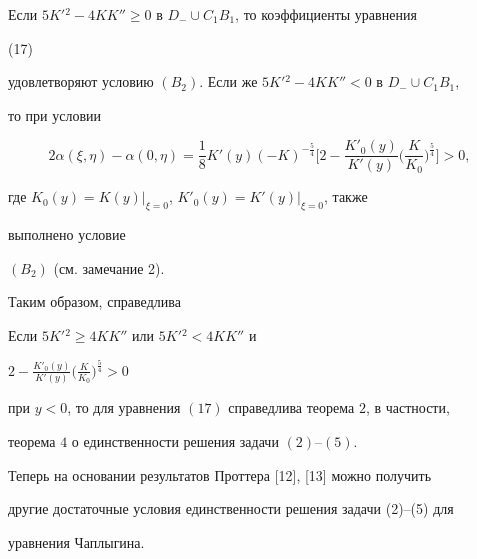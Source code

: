Если $5K'{}^2-4K K''\ge0$ в $D_-\cup C_1B_1$, то коэффициенты уравнения 


(17) 


удовлетворяют условию $(B_2)$. Если же $5K'{}^2-4K K''<0$ в $D_-\cup 


C_1B_1$, 


то при условии 


$$ 


2\alpha(\xi,\eta)-\alpha(0,\eta)=\frac{1}{8}K'(y)(-K)^{-\frac{5}{4}} 


\bigg[2-\frac{K'_0(y)}{K'(y)}\bigg(\frac{K}{K_0}\bigg)^{\frac{5}{4}} 


\bigg]>0, 


$$ 


где $K_0(y)=K(y)\big|_{\xi=0}$, $K'_0(y)=K'(y)\big|_{\xi=0}$, также 


выполнено условие 


$(B_2)$ (см. замечание 2). 


 


Таким образом, справедлива 


 


\begin{thm} 


Если $5K'{}^2\ge4K K''$ или $5K'{}^2<4K K''$ и 


$2-\frac{K'_0(y)}{K'(y)}\big(\frac{K}{K_0}\big)^{\frac{5}{4}}>0$ 


при $y<0$, то для уравнения $(17)$ справедлива теорема $2$, в частности, 


теорема $4$ о единственности решения задачи $(2)$--$(5)$. 


\end{thm} 


 


Теперь на основании результатов Проттера [12], [13] можно получить 


другие достаточные условия единственности решения задачи (2)--(5) для 


уравнения Чаплыгина. 


 


